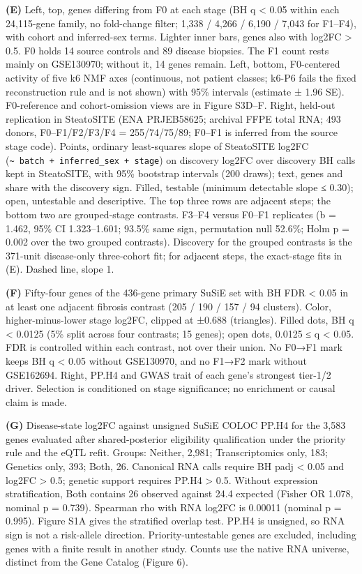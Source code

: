 \textbf{(E)} Left, top, genes differing from F0 at each stage (BH q \textless{} 0.05 within each 24,115-gene family, no fold-change filter; 1,338 / 4,266 / 6,190 / 7,043 for F1--F4), with cohort and inferred-sex terms. Lighter inner bars, genes also with \textbar log2FC\textbar{} \textgreater{} 0.5. F0 holds 14 source controls and 89 disease biopsies. The F1 count rests mainly on GSE130970; without it, 14 genes remain. Left, bottom, F0-centered activity of five k6 NMF axes (continuous, not patient classes; k6-P6 fails the fixed reconstruction rule and is not shown) with 95\% intervals (estimate ± 1.96 SE). F0-reference and cohort-omission views are in Figure S3D--F. Right, held-out replication in SteatoSITE (ENA PRJEB58625; archival FFPE total RNA; 493 donors, F0--F1/F2/F3/F4 = 255/74/75/89; F0--F1 is inferred from the source stage code). Points, ordinary least-squares slope of SteatoSITE log2FC (\texttt{\textasciitilde{}\ batch\ +\ inferred\_\allowbreak{}sex\ +\ stage}) on discovery log2FC over discovery BH calls kept in SteatoSITE, with 95\% bootstrap intervals (200 draws); text, genes and share with the discovery sign. Filled, testable (minimum detectable slope ≤ 0.30); open, untestable and descriptive. The top three rows are adjacent steps; the bottom two are grouped-stage contrasts. F3--F4 versus F0--F1 replicates (b = 1.462, 95\% CI 1.323--1.601; 93.5\% same sign, permutation null 52.6\%; Holm p = 0.002 over the two grouped contrasts). Discovery for the grouped contrasts is the 371-unit disease-only three-cohort fit; for adjacent steps, the exact-stage fits in (E). Dashed line, slope 1.

\textbf{(F)} Fifty-four genes of the 436-gene primary SuSiE set with BH FDR \textless{} 0.05 in at least one adjacent fibrosis contrast (205 / 190 / 157 / 94 clusters). Color, higher-minus-lower stage log2FC, clipped at ±0.688 (triangles). Filled dots, BH q \textless{} 0.0125 (5\% split across four contrasts; 15 genes); open dots, 0.0125 ≤ q \textless{} 0.05. FDR is controlled within each contrast, not over their union. No F0→F1 mark keeps BH q \textless{} 0.05 without GSE130970, and no F1→F2 mark without GSE162694. Right, PP.H4 and GWAS trait of each gene's strongest tier-1/2 driver. Selection is conditioned on stage significance; no enrichment or causal claim is made.

\textbf{(G)} Disease-state log2FC against unsigned SuSiE COLOC PP.H4 for the 3,583 genes evaluated after shared-posterior eligibility qualification under the priority rule and the eQTL refit. Groups: Neither, 2,981; Transcriptomics only, 183; Genetics only, 393; Both, 26. Canonical RNA calls require BH padj \textless{} 0.05 and \textbar log2FC\textbar{} \textgreater{} 0.5; genetic support requires PP.H4 \textgreater{} 0.5. Without expression stratification, Both contains 26 observed against 24.4 expected (Fisher OR 1.078, nominal p = 0.739). Spearman rho with \textbar RNA log2FC\textbar{} is 0.00011 (nominal p = 0.995). Figure S1A gives the stratified overlap test. PP.H4 is unsigned, so RNA sign is not a risk-allele direction. Priority-untestable genes are excluded, including genes with a finite result in another study. Counts use the native RNA universe, distinct from the Gene Catalog (Figure 6).

